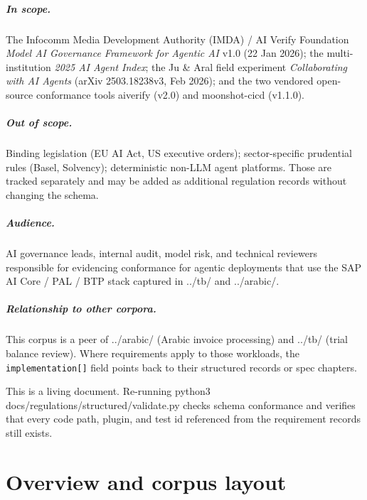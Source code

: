 \documentclass[11pt,a4paper,twoside]{report}
\newcommand{\corpus}{}
\newcommand{\tool}{}
\begin{document}
\paragraph{In scope.} The Infocomm Media Development Authority (IMDA) / AI Verify
Foundation \emph{Model AI Governance Framework for Agentic AI} v1.0 (22 Jan
2026); the multi-institution \emph{2025 AI Agent Index}; the Ju \& Aral field
experiment \emph{Collaborating with AI Agents} (arXiv 2503.18238v3, Feb 2026);
and the two vendored open-source conformance tools
\tool{aiverify} (v2.0) and \tool{moonshot-cicd} (v1.1.0).

\paragraph{Out of scope.} Binding legislation (EU AI Act, US executive
orders); sector-specific prudential rules (Basel, Solvency); deterministic
non-LLM agent platforms. Those are tracked separately and may be added as
additional regulation records without changing the schema.

\paragraph{Audience.} AI governance leads, internal audit, model risk, and
technical reviewers responsible for evidencing conformance for agentic
deployments that use the SAP AI Core / PAL / BTP stack captured in
\corpus{../tb/} and \corpus{../arabic/}.

\paragraph{Relationship to other corpora.} This corpus is a peer of
\corpus{../arabic/} (Arabic invoice processing) and \corpus{../tb/} (trial
balance review). Where requirements apply to those workloads, the
\texttt{implementation[]} field points back to their structured records or
spec chapters.

\vspace{1em}
\noindent\textcolor{reggrey}{\small This is a living document. Re-running
\tool{python3 docs/regulations/structured/validate.py} checks schema
conformance and verifies that every code path, plugin, and test id
referenced from the requirement records still exists.}
\clearpage
\chapter{Overview and corpus layout}
\label{ch:overview}
\end{document}
